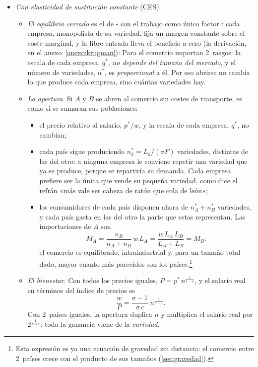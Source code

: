 \documentclass[11pt]{article}
\begin{document}
\begin{itemize}
\item \emph{Con elasticidad de sustitución constante} (CES).
  \begin{itemize}
  \item \emph{El equilibrio cerrado} es el de - con el trabajo como único factor : cada empresa, monopolista de su variedad, fija un margen constante sobre el coste marginal, y la libre entrada lleva el beneficio a cero (la derivación, en el anexo~\ref{anexo:krugman}):
  Para el comercio importan 2~rasgos: la escala de cada empresa, $q^*$, \emph{no depende del tamaño del mercado}, y el número de variedades, $n^*$, es \emph{proporcional} a él. Por eso abrirse no cambia lo que produce cada empresa, sino cuántas variedades hay.
  \item \emph{La apertura}. Si $A$ y $B$ se abren al comercio sin costes de transporte, es como si se sumaran sus poblaciones:
    \begin{itemize}
    \item el precio relativo al salario, $p^*/w$, y la escala de cada empresa, $q^*$, no cambian;
    \item cada país sigue produciendo $n_k^*=L_k/(\sigma F)$ variedades, distintas de las del otro: a ninguna empresa le conviene repetir una variedad que ya se produce, porque se repartiría su demanda. Cada empresa prefiere ser la única que vende su pequeña variedad, como dice el refrán «más vale ser cabeza de ratón que cola de león»;
    \item los consumidores de cada país disponen ahora de $n_A^*+n_B^*$ variedades, y cada país gasta en las del otro la parte que estas representan. Las importaciones de $A$ son
    $$M_A=\frac{n_B}{n_A+n_B}\,w\,L_A=\frac{w\,L_A\,L_B}{L_A+L_B}=M_B:$$
    el comercio es equilibrado, intraindustrial y, para un tamaño total dado, mayor cuanto más parecidos son los países.\footnote{Esta expresión es ya una ecuación de gravedad sin distancia: el comercio entre 2~países crece con el producto de sus tamaños (\ref{sec:gravedad}).}
    \end{itemize}
  \item \emph{El bienestar}. Con todos los precios iguales, $P=p^*\,n^{\frac{1}{1-\sigma}}$, y el salario real en términos del índice de precios es
  $$\frac{w}{P}=\frac{\sigma-1}{\sigma\,c}\;n^{\frac{1}{\sigma-1}}.$$
  Con 2~países iguales, la apertura duplica $n$ y multiplica el salario real por $2^{\frac{1}{\sigma-1}}$: toda la ganancia viene de la \emph{variedad}.

\end{itemize}
\end{itemize}
\end{document}
